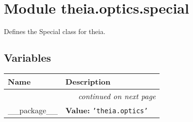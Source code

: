 %
%
%


\section{Module theia.optics.special}

    \label{theia:optics:special}
Defines the Special class for theia.



  \subsection{Variables}

    \vspace{-1cm}
\hspace{\varindent}\begin{longtable}{|p{\varnamewidth}|p{\vardescrwidth}|l}
\cline{1-2}
\cline{1-2} \centering \textbf{Name} & \centering \textbf{Description}& \\
\cline{1-2}
\endhead\cline{1-2}\multicolumn{3}{r}{\small\textit{continued on next page}}\\\endfoot\cline{1-2}
\endlastfoot\raggedright \_\-\_\-p\-a\-c\-k\-a\-g\-e\-\_\-\_\- & \raggedright \textbf{Value:} 
{\tt \texttt{'}\texttt{theia.optics}\texttt{'}}&\\
\cline{1-2}
\end{longtable}



